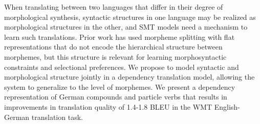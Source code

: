 When translating between two languages that differ in their degree of morphological synthesis, syntactic structures in one language may be realized as morphological structures in the other, and SMT models need a mechanism to learn such translations. Prior work has used morpheme splitting with flat representations that do not encode the hierarchical structure between morphemes, but this structure is relevant for learning morphosyntactic constraints and selectional preferences. We propose to model syntactic and morphological structure jointly in a dependency translation model, allowing the system to generalize to the level of morphemes. We present a dependency representation of German compounds and particle verbs that results in improvements in translation quality of 1.4-1.8 BLEU in the WMT English-German translation task.
